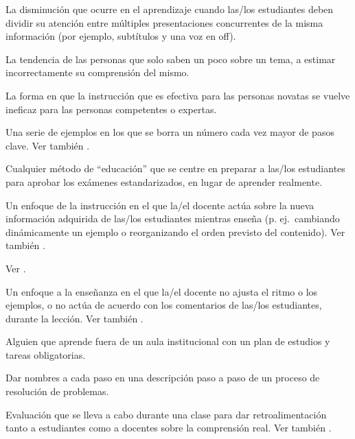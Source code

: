\begin{description}
 La disminución que ocurre
en el aprendizaje cuando las/los estudiantes deben dividir su atención entre múltiples 
presentaciones concurrentes de la misma información (por ejemplo, subtítulos y una voz en off).


 La tendencia de las personas que solo 
saben un poco sobre un tema, a estimar incorrectamente su comprensión del mismo.

 La forma en que
la instrucción que es efectiva para las personas novatas se vuelve ineficaz para
las personas competentes o expertas.

 Una serie de ejemplos en los que
se borra un número cada vez mayor de pasos clave. Ver
también .

 Cualquier método de ``educación''
que se centre en preparar a las/los estudiantes para aprobar los exámenes estandarizados, en lugar de aprender realmente.

 Un enfoque de la instrucción en el que la/el docente
actúa sobre la nueva información adquirida de las/los estudiantes mientras enseña (p. ej.\ cambiando
dinámicamente un ejemplo o reorganizando el orden previsto del contenido).
Ver también .

 Ver .

 Un enfoque a la enseñanza en el que la/el docente no ajusta el ritmo o los ejemplos, 
o no actúa de acuerdo con los comentarios de las/los estudiantes, durante la lección.  
Ver también .

 Alguien que aprende fuera de un aula institucional 
con un plan de estudios y tareas obligatorias. 

 Dar nombres a cada paso en una descripción paso a paso 
de un proceso de resolución de problemas.

 Evaluación que se lleva a cabo
durante una clase para dar retroalimentación tanto a estudiantes como a docentes
sobre la comprensión real. Ver también .


\end{description}
